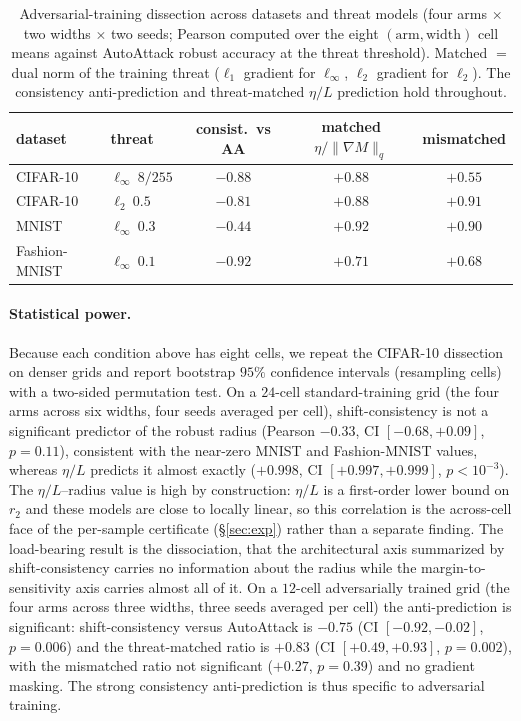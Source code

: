 \documentclass{article}
\theoremstyle{definition}
\begin{document}
\begin{table}[h]\centering
\caption{Adversarial-training dissection across datasets and threat models (four arms $\times$ two widths $\times$ two seeds; Pearson computed over the eight $(\mathrm{arm},\mathrm{width})$ cell means against AutoAttack robust accuracy at the threat threshold). Matched ${=}$ dual norm of the training threat ($\ell_1$ gradient for $\ell_\infty$, $\ell_2$ gradient for $\ell_2$). The consistency anti-prediction and threat-matched $\eta/L$ prediction hold throughout.}
\label{tab:at-general}
\footnotesize
\begin{tabular}{llccc}
\toprule
dataset & threat & consist.\ vs AA & matched $\eta/\|\nabla M\|_q$ & mismatched \\
\midrule
CIFAR-10      & $\ell_\infty\ 8/255$ & $-0.88$ & $+0.88$ & $+0.55$ \\
CIFAR-10      & $\ell_2\ 0.5$        & $-0.81$ & $+0.88$ & $+0.91$ \\
MNIST         & $\ell_\infty\ 0.3$   & $-0.44$ & $+0.92$ & $+0.90$ \\
Fashion-MNIST & $\ell_\infty\ 0.1$   & $-0.92$ & $+0.71$ & $+0.68$ \\
\bottomrule
\end{tabular}
\end{table}

\paragraph{Statistical power.} Because each condition above has eight cells, we repeat the CIFAR-10 dissection on denser grids and report bootstrap $95\%$ confidence intervals (resampling cells) with a two-sided permutation test. On a $24$-cell standard-training grid (the four arms across six widths, four seeds averaged per cell), shift-consistency is not a significant predictor of the robust radius (Pearson $-0.33$, CI $[-0.68,+0.09]$, $p=0.11$), consistent with the near-zero MNIST and Fashion-MNIST values, whereas $\eta/L$ predicts it almost exactly ($+0.998$, CI $[+0.997,+0.999]$, $p<10^{-3}$). The $\eta/L$--radius value is high by construction: $\eta/L$ is a first-order lower bound on $r_2$ and these models are close to locally linear, so this correlation is the across-cell face of the per-sample certificate (\S\ref{sec:exp}) rather than a separate finding. The load-bearing result is the dissociation, that the architectural axis summarized by shift-consistency carries no information about the radius while the margin-to-sensitivity axis carries almost all of it. On a $12$-cell adversarially trained grid (the four arms across three widths, three seeds averaged per cell) the anti-prediction is significant: shift-consistency versus AutoAttack is $-0.75$ (CI $[-0.92,-0.02]$, $p=0.006$) and the threat-matched ratio is $+0.83$ (CI $[+0.49,+0.93]$, $p=0.002$), with the mismatched ratio not significant ($+0.27$, $p=0.39$) and no gradient masking. The strong consistency anti-prediction is thus specific to adversarial training.
\end{document}
